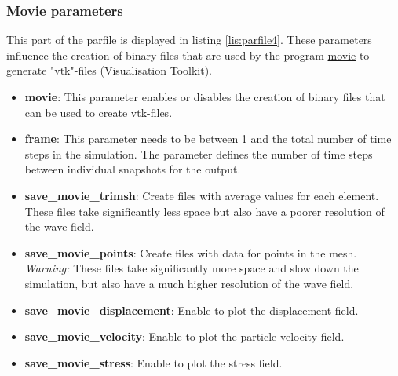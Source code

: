     	\subsubsection{Movie parameters}
    	\label{subsubsec:moviepar}
			This part of the parfile is displayed in listing \ref{lis:parfile4}. These parameters influence the creation of binary files that are used by the program \url{movie} to generate "vtk"-files (Visualisation Toolkit).
			
    		\begin{itemize}
    			\item \textbf{movie}: This parameter enables or disables the creation of binary files that can be used to create vtk-files.
    			\item \textbf{frame}: This parameter needs to be between 1 and the total number of time steps in the simulation. The parameter defines the number of time steps between individual snapshots for the output.
    			\item \textbf{save\_movie\_trimsh}: Create files with average values for each element. These files take significantly less space but also have a poorer resolution of the wave field.
    			\item \textbf{save\_movie\_points}: Create files with data for points in the mesh. \textit{Warning:} These files take significantly more space and slow down the simulation, but also have a much higher resolution of the wave field.
    			\item \textbf{save\_movie\_displacement}: Enable to plot the displacement field.
    			\item \textbf{save\_movie\_velocity}: Enable to plot the particle velocity field.
    			\item \textbf{save\_movie\_stress}: Enable to plot the stress field.
    		\end{itemize}
